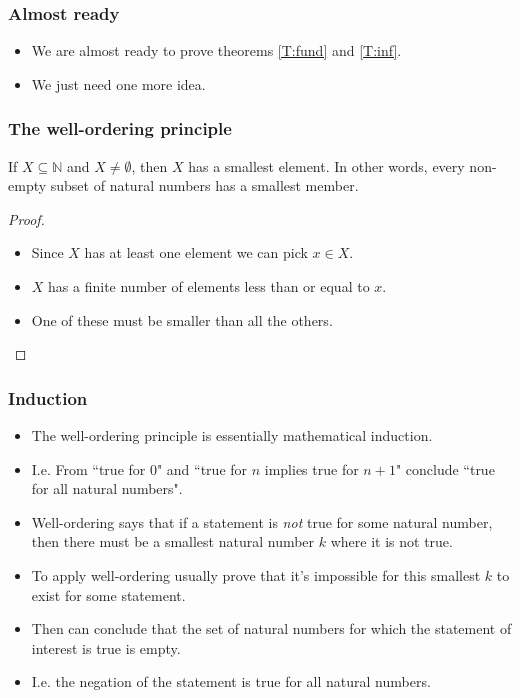 \documentclass[handout]{beamer}
\newcommand{\bN}{\mathbb{N}}
\begin{document}
\begin{frame}
\frametitle{Almost ready}
\begin{itemize}
\item We are almost ready to prove theorems \ref{T:fund} and \ref{T:inf}.
\vspace{0.5cm}
\item We just need one more idea.
\end{itemize}
\end{frame}

\begin{frame}
\frametitle{The well-ordering principle}
\begin{lemma}\label{L:well}
If $X\subseteq \bN$ and $X\neq \emptyset$, then $X$ has a smallest element. In other words, every non-empty subset of natural numbers has a smallest member.
\end{lemma}
\begin{proof}
\begin{itemize}
\item Since $X$ has at least one element we can pick $x\in X$. 
\item $X$ has a finite number of elements less than or equal to $x$. 
\item One of these must be smaller than all the others.
\end{itemize}
\end{proof}
\end{frame}

\begin{frame}
\frametitle{Induction}
\begin{itemize}
\item The well-ordering principle is essentially mathematical induction. 
\vspace{0.2cm}
\item I.e. From ``true for 0" and ``true for $n$ implies true for $n+1$" conclude ``true for all natural numbers". 
\vspace{0.2cm}
\item Well-ordering says that if a statement is \emph{not} true for some natural number, then there must be a smallest natural number $k$ where it is not true.
\vspace{0.2cm} 
\item To apply well-ordering usually prove that it's impossible for this smallest $k$ to exist for some statement. 
\vspace{0.2cm}
\item Then can conclude that the set of natural numbers for which the statement of interest is true is empty.
\vspace{0.2cm}
\item I.e. the negation of the statement is true for all natural numbers.
\end{itemize}
\end{frame}
\end{document}
